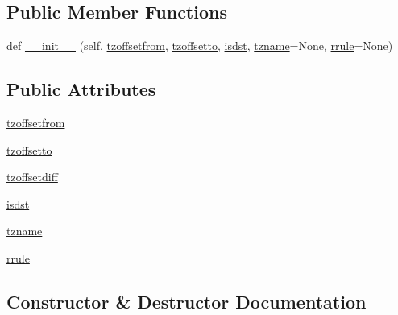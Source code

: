 \subsection*{Public Member Functions}
\begin{DoxyCompactItemize}
\item 
def \hyperlink{classdateutil_1_1tz_1_1tz_1_1__tzicalvtzcomp_a2a749ecfdd4580b1d1c3ab2e6d54461d}{\+\_\+\+\_\+init\+\_\+\+\_\+} (self, \hyperlink{classdateutil_1_1tz_1_1tz_1_1__tzicalvtzcomp_ad79ad7effe11cf2f56e667b39bf2e25b}{tzoffsetfrom}, \hyperlink{classdateutil_1_1tz_1_1tz_1_1__tzicalvtzcomp_a37c04283978799102adbe657624de60d}{tzoffsetto}, \hyperlink{classdateutil_1_1tz_1_1tz_1_1__tzicalvtzcomp_a23b45ed6ea3addb12afaf2cf54a59a2a}{isdst}, \hyperlink{classdateutil_1_1tz_1_1tz_1_1__tzicalvtzcomp_a868e31a0d7ff8db148c2fb4eb337baab}{tzname}=None, \hyperlink{classdateutil_1_1tz_1_1tz_1_1__tzicalvtzcomp_af8a1802db305e9520b8cbd0fe85f32f8}{rrule}=None)
\end{DoxyCompactItemize}
\subsection*{Public Attributes}
\begin{DoxyCompactItemize}
\item 
\hyperlink{classdateutil_1_1tz_1_1tz_1_1__tzicalvtzcomp_ad79ad7effe11cf2f56e667b39bf2e25b}{tzoffsetfrom}
\item 
\hyperlink{classdateutil_1_1tz_1_1tz_1_1__tzicalvtzcomp_a37c04283978799102adbe657624de60d}{tzoffsetto}
\item 
\hyperlink{classdateutil_1_1tz_1_1tz_1_1__tzicalvtzcomp_ac2551e35a54220acbd73376008d2e30c}{tzoffsetdiff}
\item 
\hyperlink{classdateutil_1_1tz_1_1tz_1_1__tzicalvtzcomp_a23b45ed6ea3addb12afaf2cf54a59a2a}{isdst}
\item 
\hyperlink{classdateutil_1_1tz_1_1tz_1_1__tzicalvtzcomp_a868e31a0d7ff8db148c2fb4eb337baab}{tzname}
\item 
\hyperlink{classdateutil_1_1tz_1_1tz_1_1__tzicalvtzcomp_af8a1802db305e9520b8cbd0fe85f32f8}{rrule}
\end{DoxyCompactItemize}


\subsection{Constructor \& Destructor Documentation}
\mbox{\label{classdateutil_1_1tz_1_1tz_1_1__tzicalvtzcomp_a2a749ecfdd4580b1d1c3ab2e6d54461d}} 
